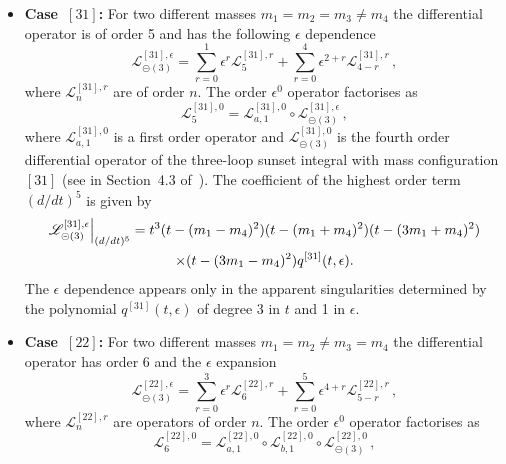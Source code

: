 \documentclass[a4paper,12pt]{article}
\numberwithin{equation}{section}
\numberwithin{figure}{section}
\def\su{\circleddash}
\begin{document}
\begin{itemize}

  \item   {\bf Case~$[31]$:} For two different masses $m_1=m_2=m_3 \neq m_4$ the
  differential operator is of order 5 and has the following $\epsilon$ dependence
  \begin{equation}
    \mathscr{L}^{[31],\epsilon}_{\su(3)}=       \sum_{r=0}^1 \epsilon^r
    \mathscr{L}^{[31],r}_{5}+  \sum_{r=0}^4 \epsilon^{2+r}   \mathscr{L}^{[31],r}_{4-r} \, ,
  \end{equation}
  where  $ \mathscr{L}^{[31],r}_{n}$ are of order $n$.
  The order $\epsilon^0$ operator factorises as
  \begin{equation}
         \mathscr{L}^{[31],0}_{5}=   \mathscr{L}^{[31],0}_{a,1} \circ \mathscr{L}^{[31],\epsilon}_{\su(3)} \, , 
       \end{equation}
        where  $ \mathscr{L}^{[31],0}_{a,1}$ is a  first order operator
       and $\mathscr{L}^{[31],0}_{\su(3)}$ is the fourth order
       differential operator of the
       three-loop sunset integral with mass configuration $[31]$ (see 
       in Section~4.3 of~\cite{Lairez:2022zkj}).
       The coefficient of the highest order term $(d/dt)^5$    is given by
       \begin{multline}
                   \mathscr{L}^{[31],\epsilon}_{\su(3)}\Big\vert_{(d/dt)^5}=
                   t^3  (t-(m_1-m_4)^2)(t-(m_1+m_4)^2)(t-(3m_1+m_4)^2) \cr\times (t-(3m_1-m_4)^2)
            q^{[31]}(t,\epsilon)      .
                 \end{multline}
                 The $\epsilon$ dependence appears only in the
                 apparent singularities determined by the polynomial
                 $q^{[31]}(t,\epsilon)$ of degree 3 in $t$ and 1 in $\epsilon$.
\item   {\bf Case~$[22]$:} For two different masses $m_1=m_2\neq m_3 = m_4$ the
  differential operator has order 6 and the $\epsilon$ expansion 
  \begin{equation}
    \mathscr{L}_{\su(3)}^{[22],\epsilon}=     \sum_{r=0}^3 \epsilon^r
    \mathscr{L}^{[22],r}_{6}+  \sum_{r=0}^5 \epsilon^{4+r}   \mathscr{L}^{[22],r}_{5-r} \, ,
  \end{equation}
  where  $ \mathscr{L}^{[22],r}_{n}$ are 
  operators of order $n$.
  The order $\epsilon^0$ operator factorises as
  \begin{equation}
         \mathscr{L}^{[22],0}_{6}=   \mathscr{L}^{[22],0}_{a,1} \circ \mathscr{L}^{[22],0}_{b,1} \circ\mathscr{L}^{[22],0}_{\su(3)} \,,

\end{equation}
\end{itemize}
\end{document}

